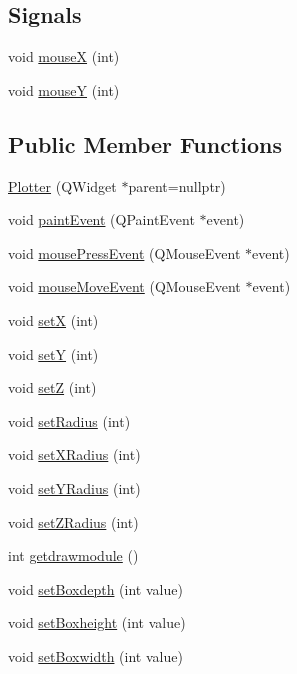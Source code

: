 \subsection*{Signals}
\begin{DoxyCompactItemize}
\item 
void \hyperlink{class_plotter_acc318f23eb9f135d13431c05221e1ee9}{mouseX} (int)
\item 
void \hyperlink{class_plotter_ae66c4db3fec253319af537aa627d8f1b}{mouseY} (int)
\end{DoxyCompactItemize}
\subsection*{Public Member Functions}
\begin{DoxyCompactItemize}
\item 
\hyperlink{class_plotter_a1807627530de30ae58dff3c42a823497}{Plotter} (Q\+Widget $\ast$parent=nullptr)
\item 
void \hyperlink{class_plotter_a06477bf987646f000a8982db1352a11d}{paint\+Event} (Q\+Paint\+Event $\ast$event)
\item 
void \hyperlink{class_plotter_aac8dfc9c49d06ccf085973ceec6eb50c}{mouse\+Press\+Event} (Q\+Mouse\+Event $\ast$event)
\item 
void \hyperlink{class_plotter_aedd6ee525b4cacb6bcbc7540ed1ef3e9}{mouse\+Move\+Event} (Q\+Mouse\+Event $\ast$event)
\item 
void \hyperlink{class_plotter_a57dcb319c1d0ce82bc45d3dba2ece38e}{setX} (int)
\item 
void \hyperlink{class_plotter_a586a5dc38bee3fdd3d89889f3c322fbc}{setY} (int)
\item 
void \hyperlink{class_plotter_af71ca471de0dbf45efd7467662a74bb6}{setZ} (int)
\item 
void \hyperlink{class_plotter_a7f39ba0215921d27437d96d56935429a}{set\+Radius} (int)
\item 
void \hyperlink{class_plotter_abd1810ebfbc5f3632fb3ad2fbeb28eb4}{set\+X\+Radius} (int)
\item 
void \hyperlink{class_plotter_aedf70b23a2128f7438500f9abfe9a88c}{set\+Y\+Radius} (int)
\item 
void \hyperlink{class_plotter_ab1ff5f4a6357b1b8bd51edede9932ad7}{set\+Z\+Radius} (int)
\item 
int \hyperlink{class_plotter_af2eefeff5343cde84639f54612b73338}{getdrawmodule} ()
\item 
void \hyperlink{class_plotter_aa599dcb990c94c5effa199d2696f3fba}{set\+Boxdepth} (int value)
\item 
void \hyperlink{class_plotter_a67bab31d1a00f883236ebb26df33a229}{set\+Boxheight} (int value)
\item 
void \hyperlink{class_plotter_a8c1b140601370f63bf0bcb0255979bd9}{set\+Boxwidth} (int value)
\end{DoxyCompactItemize}
